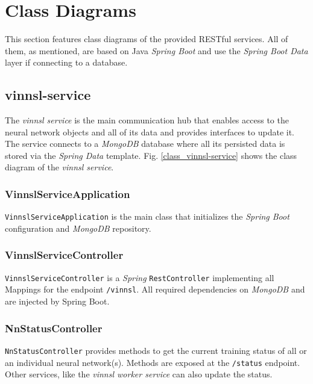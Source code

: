 \section{Class Diagrams}\label{class-diagrams}

This section features class diagrams of the provided RESTful services.
All of them, as mentioned, are based on Java \emph{Spring Boot} and use
the \emph{Spring Boot Data} layer if connecting to a database.

\subsection{vinnsl-service}\label{vinnsl-service-1}

The \emph{vinnsl service} is the main communication hub that enables
access to the neural network objects and all of its data and provides
interfaces to update it. The service connects to a \emph{MongoDB}
database where all its persisted data is stored via the \emph{Spring
Data} template. Fig. \ref{class_vinnsl-service} shows the class diagram
of the \emph{vinnsl service}.

\subsubsection{VinnslServiceApplication}\label{vinnslserviceapplication}

\texttt{VinnslServiceApplication} is the main class that initializes the
\emph{Spring Boot} configuration and \emph{MongoDB} repository.

\subsubsection{VinnslServiceController}\label{vinnslservicecontroller}

\texttt{VinnslServiceController} is a \emph{Spring}
\texttt{RestController} implementing all Mappings for the endpoint
\texttt{/vinnsl}. All required dependencies on \emph{MongoDB} and are
injected by Spring Boot.

\subsubsection{NnStatusController}\label{nnstatuscontroller}

\texttt{NnStatusController} provides methods to get the current training
status of all or an individual neural network(s). Methods are exposed at
the \texttt{/status} endpoint. Other services, like the \emph{vinnsl
worker service} can also update the status.


